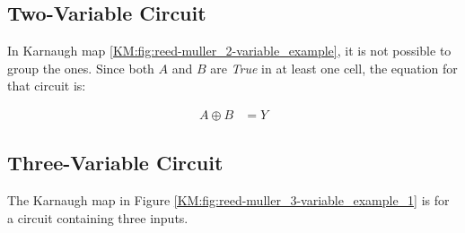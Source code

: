\subsection{Two-Variable Circuit}
\label{KM:subsec:two_variable_circuit}

In Karnaugh map \ref{KM:fig:reed-muller_2-variable_example}, it is not possible to group the ones. Since both $ A $ and $ B $ are \emph{True} in at least one cell, the equation for that circuit is: 

\begin{align}
  \label{KM:eq:reed-muller_2_vars_ex_1}
  A \oplus B &= Y 
\end{align}

\subsection{Three-Variable Circuit}
\label{KM:subsec:three_variable_circuit}

The Karnaugh map in Figure \ref{KM:fig:reed-muller_3-variable_example_1} is for a circuit containing three inputs.


